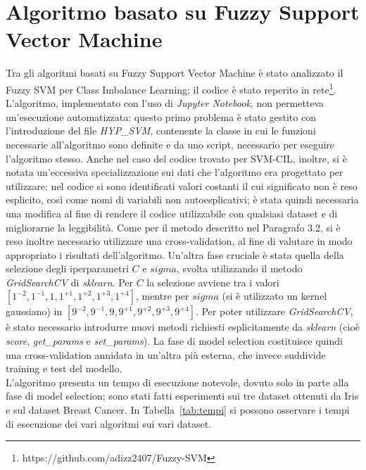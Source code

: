 \documentclass[oneside, openany]{book}
\begin{document}
	\section{Algoritmo basato su Fuzzy Support Vector Machine}
	Tra gli algoritmi basati su Fuzzy Support Vector Machine è stato analizzato il Fuzzy SVM per Class Imbalance Learning; il codice è stato reperito in rete\footnote{https://github.com/adizz2407/Fuzzy-SVM}. L'algoritmo, implementato con l'uso di \textit{Jupyter Notebook}, non permetteva un'esecuzione automatizzata: questo primo problema è stato gestito con l'introduzione del file \textit{HYP\_SVM}, contenente la classe in cui le funzioni necessarie all'algoritmo sono definite e da uno script, necessario per eseguire l'algoritmo stesso. Anche nel caso del codice trovato per SVM-CIL, inoltre, si è notata un'eccessiva specializzazione sui dati che l'algoritmo era progettato per utilizzare: nel codice si sono identificati valori costanti il cui significato non è reso esplicito, così come nomi di variabili non autoesplicativi; è stata quindi necessaria una modifica al fine di rendere il codice utilizzabile con qualsiasi dataset e di migliorarne la leggibilità. Come per il metodo descritto nel Paragrafo 3.2, si è reso inoltre necessario utilizzare una cross-validation, al fine di valutare in modo appropriato i risultati dell'algoritmo. Un'altra fase cruciale è stata quella della selezione degli iperparametri $C$ e $sigma$, svolta utilizzando il metodo \textit{GridSearchCV} di \textit{sklearn}. Per $C$ la selezione avviene tra i valori $[1^{-2}, 1^{-1}, 1, 1^{+1}, 1^{+2}, 1^{+3}, 1^{+4}]$, mentre per $sigma$ (si è utilizzato un kernel gaussiano) in $[9^{-2}, 9^{-1}, 9, 9^{+1}, 9^{+2}, 9^{+3}, 9^{+4}]$. Per poter utilizzare \textit{GridSearchCV}, è stato necessario introdurre nuovi metodi richiesti esplicitamente da \textit{sklearn} (cioè \textit{score}, \textit{get\_params} e \textit{set\_params}). La fase di model selection costituisce quindi una cross-validation annidata in un'altra più esterna, che invece suddivide training e test del modello.\\
	L'algoritmo presenta un tempo di esecuzione notevole, dovuto solo in parte alla fase di model selection; sono stati fatti esperimenti sui tre dataset ottenuti da Iris e sul dataset Breast Cancer. In Tabella~\ref{tab:tempi} si possono osservare i tempi di esecuzione dei vari algoritmi sui vari dataset.
	
\end{document}
